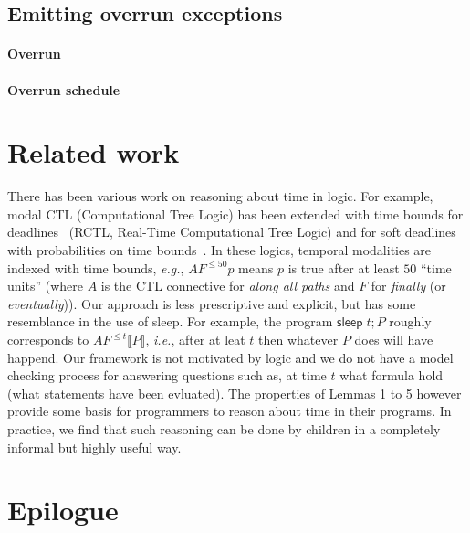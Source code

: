 \documentclass[preprint]{sigplanconf}
\renewcommand{\leq}{\leqslant}
\newcommand{\note}[1]{{\color{blue}{#1}}}
\theoremstyle{definition}
\newcommand{\sleep}{\mathsf{sleep}\;}
\newcommand{\sleepOp}{\textsf{sleep}}
\newcommand{\interp}[1]{\llbracket{#1}\rrbracket}
\newcommand{\ie}{\emph{i.e.}}
\newcommand{\eg}{\emph{e.g.}}
\begin{document}
\subsection{Emitting overrun exceptions}

\paragraph{Overrun}

\note{TODO: report warnings when overrun occurs- should be easy I think
by adding stuff to sleep.}

\paragraph{Overrun schedule}

\note{TOOD: Again pretty easy, just need some info in the monad
to say what counts as a bad overrun}

\section{Related work}

There has been various work on reasoning about time in logic. For
example, modal CTL (Computational Tree Logic) has been extended with
time bounds for deadlines~\cite{emerson1991quantitative} (RCTL,
Real-Time Computational Tree Logic) and for soft deadlines with
probabilities on time bounds~\cite{hansson1994logic}. In these logics,
temporal modalities are indexed with time bounds, \eg{}, $AF^{\leq 50}
p$ means $p$ is true after at least $50$ ``time units'' (where $A$ is
the CTL connective for \emph{along all paths} and $F$ for
\emph{finally} (or \emph{eventually})). Our approach is less
prescriptive and explicit, but has some resemblance in the use of
\sleepOp{}. For example, the program $\sleep t ; P$ roughly
corresponds to $AF^{\leq t} \interp{P}$, \ie{}, after at leat $t$ then
whatever $P$ does will have happend. Our framework is not motivated by
logic and we do not have a model checking process for answering
questions such as, at time $t$ what formula hold (what statements have
been evluated).  The properties of Lemmas 1 to 5 however provide some
basis for programmers to reason about time in their programs. In
practice, we find that such reasoning can be done by children in a
completely informal but highly useful way.



\section{Epilogue}
\end{document}
